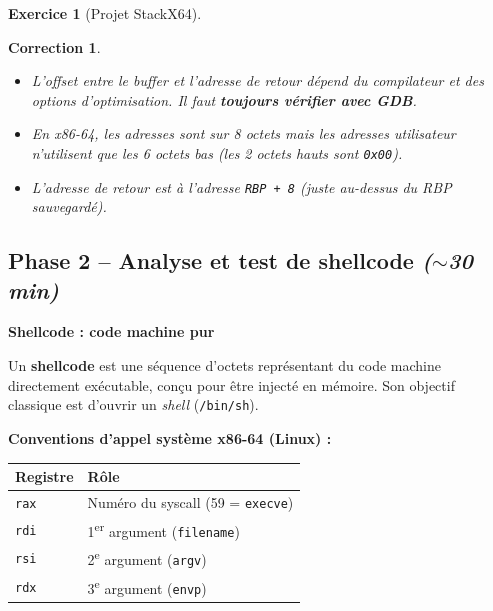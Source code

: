 \documentclass[a4paper,11pt]{article}
\theoremstyle{plain}
\newtheorem{correction}{Correction}
\theoremstyle{definition}
\newtheorem{exercice}{Exercice}
\begin{document}
\begin{exercice}[Projet StackX64]
\begin{correction}
\begin{pointcle}
\begin{itemize}
    \item L'offset entre le buffer et l'adresse de retour dépend du compilateur et des options d'optimisation. Il faut \textbf{toujours vérifier avec GDB}.
    \item En x86-64, les adresses sont sur 8 octets mais les adresses utilisateur n'utilisent que les 6 octets bas (les 2 octets hauts sont \texttt{0x00}).
    \item L'adresse de retour est à l'adresse \texttt{RBP + 8} (juste au-dessus du RBP sauvegardé).
\end{itemize}
\end{pointcle}

\end{correction}



\subsection*{Phase 2 -- Analyse et test de shellcode \hfill\normalfont\textit{($\sim$30 min)}}

\begin{rappel}
\textbf{Shellcode : code machine pur}

Un \textbf{shellcode} est une séquence d'octets représentant du code machine directement exécutable, conçu pour être injecté en mémoire. Son objectif classique est d'ouvrir un \textit{shell} (\texttt{/bin/sh}).

\medskip
\textbf{Conventions d'appel système x86-64 (Linux) :}
\begin{center}
\begin{tabular}{ll}
\toprule
\textbf{Registre} & \textbf{Rôle} \\
\midrule
\texttt{rax} & Numéro du syscall (59 = \texttt{execve}) \\
\texttt{rdi} & 1\textsuperscript{er} argument (\texttt{filename}) \\
\texttt{rsi} & 2\textsuperscript{e} argument (\texttt{argv}) \\
\texttt{rdx} & 3\textsuperscript{e} argument (\texttt{envp}) \\
\bottomrule
\end{tabular}
\end{center}


\end{rappel}
\end{exercice}
\end{document}
